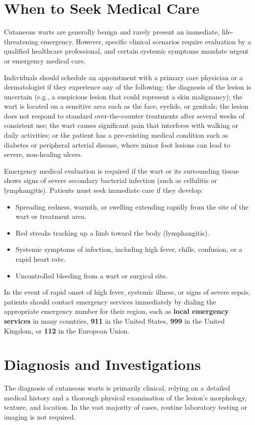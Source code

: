 \section*{When to Seek Medical Care}
Cutaneous warts are generally benign and rarely present an immediate, life-threatening emergency. However, specific clinical scenarios require evaluation by a qualified healthcare professional, and certain systemic symptoms mandate urgent or emergency medical care.

Individuals should schedule an appointment with a primary care physician or a dermatologist if they experience any of the following: the diagnosis of the lesion is uncertain (e.g., a suspicious lesion that could represent a skin malignancy); the wart is located on a sensitive area such as the face, eyelids, or genitals; the lesion does not respond to standard over-the-counter treatments after several weeks of consistent use; the wart causes significant pain that interferes with walking or daily activities; or the patient has a pre-existing medical condition such as diabetes or peripheral arterial disease, where minor foot lesions can lead to severe, non-healing ulcers.

Emergency medical evaluation is required if the wart or its surrounding tissue shows signs of severe secondary bacterial infection (such as cellulitis or lymphangitis). Patients must seek immediate care if they develop:
\begin{itemize}
    \item Spreading redness, warmth, or swelling extending rapidly from the site of the wart or treatment area.
    \item Red streaks tracking up a limb toward the body (lymphangitis).
    \item Systemic symptoms of infection, including high fever, chills, confusion, or a rapid heart rate.
    \item Uncontrolled bleeding from a wart or surgical site.
\end{itemize}
In the event of rapid onset of high fever, systemic illness, or signs of severe sepsis, patients should contact emergency services immediately by dialing the appropriate emergency number for their region, such as \textbf{local emergency services} in many countries, \textbf{911} in the United States, \textbf{999} in the United Kingdom, or \textbf{112} in the European Union.

\section*{Diagnosis and Investigations}
The diagnosis of cutaneous warts is primarily clinical, relying on a detailed medical history and a thorough physical examination of the lesion's morphology, texture, and location. In the vast majority of cases, routine laboratory testing or imaging is not required.

